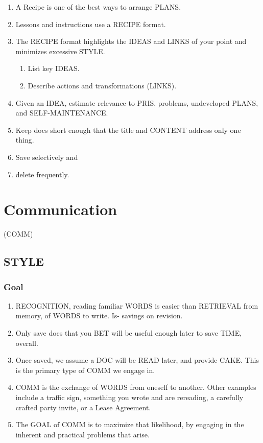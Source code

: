 \documentclass[
]{book}
\providecommand{\tightlist}{%
  \setlength{\itemsep}{0pt}\setlength{\parskip}{0pt}}
\begin{document}
\begin{enumerate}
\def\labelenumi{\arabic{enumi}.}
\setcounter{enumi}{34}
\tightlist
\item
  A Recipe is one of the best ways to arrange PLANS.
\item
  Lessons and instructions use a RECIPE format.
\item
  The RECIPE format highlights the IDEAS and LINKS of your point and minimizes excessive STYLE.

  \begin{enumerate}
  \def\labelenumii{\arabic{enumii}.}
  \tightlist
  \item
    List key IDEAS.
  \item
    Describe actions and transformations (LINKS).
  \end{enumerate}
\item
  Given an IDEA, estimate relevance to PRIS, problems, undeveloped
  PLANS, and SELF-MAINTENANCE.
\item
  Keep docs short enough that the title and CONTENT address only one
  thing.
\item
  Save selectively and
\item
  delete frequently.
\end{enumerate}

\hypertarget{communication}{%
\chapter{Communication}\label{communication}}

(COMM)

\hypertarget{style}{%
\section{STYLE}\label{style}}

\hypertarget{goal}{%
\subsection{Goal}\label{goal}}

\begin{enumerate}
\def\labelenumi{\arabic{enumi}.}
\setcounter{enumi}{41}
\tightlist
\item
  RECOGNITION, reading familiar WORDS is easier than RETRIEVAL from
  memory, of WORDS to write. Is- savings on revision.
\item
  Only save docs that you BET will be useful enough later to save TIME,
  overall.
\item
  Once saved, we assume a DOC will be READ later, and provide CAKE.
  This is the primary type of COMM we engage in.
\item
  COMM is the exchange of WORDS from oneself to another. Other
  examples include a traffic sign, something you wrote and are
  rereading, a carefully crafted party invite, or a Lease Agreement.
\item
  The GOAL of COMM is to maximize that likelihood, by engaging in the
  inherent and practical problems that arise.
\end{enumerate}
\end{document}
